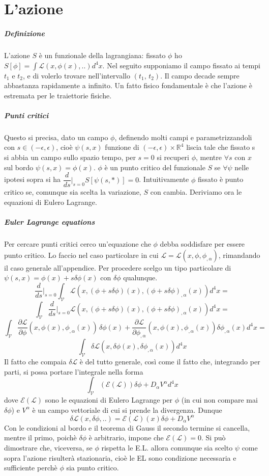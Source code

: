 \documentclass[]{article}
\newcommand{\al}{\alpha}
\begin{document}
\section*{L'azione}
\subparagraph{Definizione}
L'azione $S$ è un funzionale della lagrangiana: fissato $\phi$ ho $S[\phi] = \int \mathcal{L}(x,\phi(x), ..) d^4x$. Nel seguito supponiamo il campo fissato ai tempi $t_1$ e $t_2$, e di volerlo trovare nell'intervallo $(t_1,\,t_2)$. Il campo decade sempre abbastanza rapidamente a infinito. Un fatto fisico fondamentale è che l'azione è estremata per le traiettorie fisiche.
\subparagraph{Punti critici}
Questo si precisa, dato un campo $\phi$, definendo molti campi e parametrizzandoli con $s\in(-\epsilon, \epsilon)$, cioè $\psi (s, x)$ funzione di $(-\epsilon,\epsilon) \times \mathbb{R}^4$ liscia tale che fissato s si abbia un campo sullo spazio tempo, per $s=0$ si recuperi $\phi$, mentre $\forall s$ con $x$ sul bordo $\psi(s, x) = \phi(x)$. $\phi$ è un punto critico del funzionale $S$ se $\forall \psi$ nelle ipotesi sopra si ha $\dfrac{d}{ds}|_{s=0} S[\psi(s, *)] = 0$. Intuitivamente $\phi$ fissato è punto critico se,  comunque sia scelta la variazione, $S$ con cambia. Deriviamo ora le equazioni di Eulero Lagrange.
\subparagraph{Euler Lagrange equations}
Per cercare punti critici cerco un'equazione che $\phi$ debba soddisfare per essere punto critico. Lo faccio nel caso particolare in cui $\mathcal{L} = \mathcal{L}(x, \phi, \phi_{,\al})$, rimandando il caso generale all'appendice. Per procedere scelgo un tipo particolare di $\psi (s, x) = \phi(x) + s \delta \phi(x)$ con $\delta \phi$ qualunque.
$$\dfrac{d}{ds}|_{s=0} \int_\mathcal{V} \mathcal{L} (x, (\phi + s \delta \phi) (x), (\phi + s \delta \phi)_{,\al} (x)) d^4x = $$
$$\int_\mathcal{V} \dfrac{d}{ds}|_{s=0}\mathcal{L} (x, (\phi + s \delta \phi) (x), (\phi + s \delta \phi)_{,\al} (x)) d^4x = $$
$$\int_\mathcal{V} \dfrac{\partial \mathcal{L}}{\partial \phi} (x, \phi (x), \phi_{,\al} (x))\, \delta \phi(x) + \dfrac{\partial \mathcal{L}}{\partial \phi_{,\al}} (x, \phi (x), \phi_{,\al} (x)) \delta \phi_{,\al}(x) d^4x = $$
$$\int_\mathcal{V} \delta \mathcal{L} (x, \delta \phi (x), \delta \phi_{,\al} (x)) d^4x$$
Il fatto che compaia $\delta \mathcal{L}$ è del tutto generale, così come il fatto che, integrando per parti, si possa portare l'integrale nella forma
$$\int_\mathcal{V} (\mathcal{E}(\mathcal{L})) \delta \phi + D_\al V^\al d^4x$$
dove $\mathcal{E}(\mathcal{L})$ sono le equazioni di Eulero Lagrange per $\phi$ (in cui non compare mai $\delta \phi$) e $V^\al$ è un campo vettoriale di cui si prende la divergenza.
Dunque
\begin{equation} \label{DeltaLExpression}
	\delta \mathcal{L}(x, \delta \phi, ..) = \mathcal{E}(\mathcal{L})(x) \delta \phi + D_\al V^\al
\end{equation}
Con le condizioni al bordo e il teorema di Gauss il secondo termine si cancella, mentre il primo, poichè $\delta \phi$ è arbitrario, impone che $\mathcal{E}(\mathcal{L}) = 0$. Si può dimostrare che, viceversa, se $\phi$ rispetta le E.L. allora comunque sia scelto $\psi$ come sopra l'azione risulterà stazionaria, cioè le EL sono condizione necessaria e sufficiente perchè $\phi$ sia punto critico.
\end{document}
